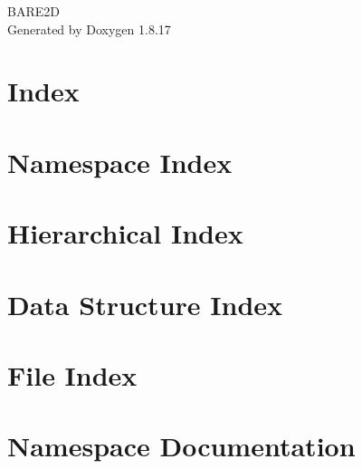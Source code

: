 \let\mypdfximage\pdfximage\def\pdfximage{\immediate\mypdfximage}\documentclass[twoside]{book}
\newcommand{\+}{\discretionary{\mbox{\scriptsize$\hookleftarrow$}}{}{}}
\newcommand{\clearemptydoublepage}{%
  \newpage{\pagestyle{empty}\cleardoublepage}%
}
\begin{document}
\hypersetup{pageanchor=false,
             bookmarksnumbered=true,
             pdfencoding=unicode
            }
\begin{titlepage}
\vspace*{7cm}
\begin{center}%
{\Large B\+A\+R\+E2D }\\
\vspace*{1cm}
{\large Generated by Doxygen 1.8.17}\\
\end{center}
\end{titlepage}
\clearemptydoublepage
{}
\tableofcontents
\clearemptydoublepage
{}
\hypersetup{pageanchor=true}

\chapter{Index}
\label{index}\hypertarget{index}{}
\chapter{Namespace Index}

\chapter{Hierarchical Index}

\chapter{Data Structure Index}

\chapter{File Index}

\chapter{Namespace Documentation}





\end{document}
